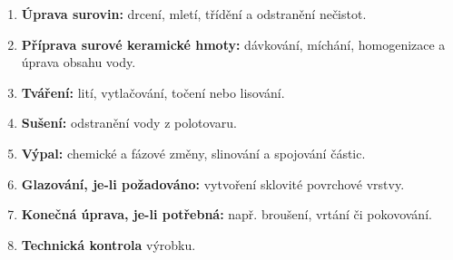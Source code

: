\begin{enumerate}
\item \textbf{Úprava surovin:} drcení, mletí, třídění a odstranění nečistot.
\item \textbf{Příprava surové keramické hmoty:} dávkování, míchání, homogenizace a úprava obsahu vody.
\item \textbf{Tváření:} lití, vytlačování, točení nebo lisování.
\item \textbf{Sušení:} odstranění vody z polotovaru.
\item \textbf{Výpal:} chemické a fázové změny, slinování a spojování částic.
\item \textbf{Glazování, je-li požadováno:} vytvoření sklovité povrchové vrstvy.
\item \textbf{Konečná úprava, je-li potřebná:} např. broušení, vrtání či pokovování.
\item \textbf{Technická kontrola} výrobku.
\end{enumerate}
